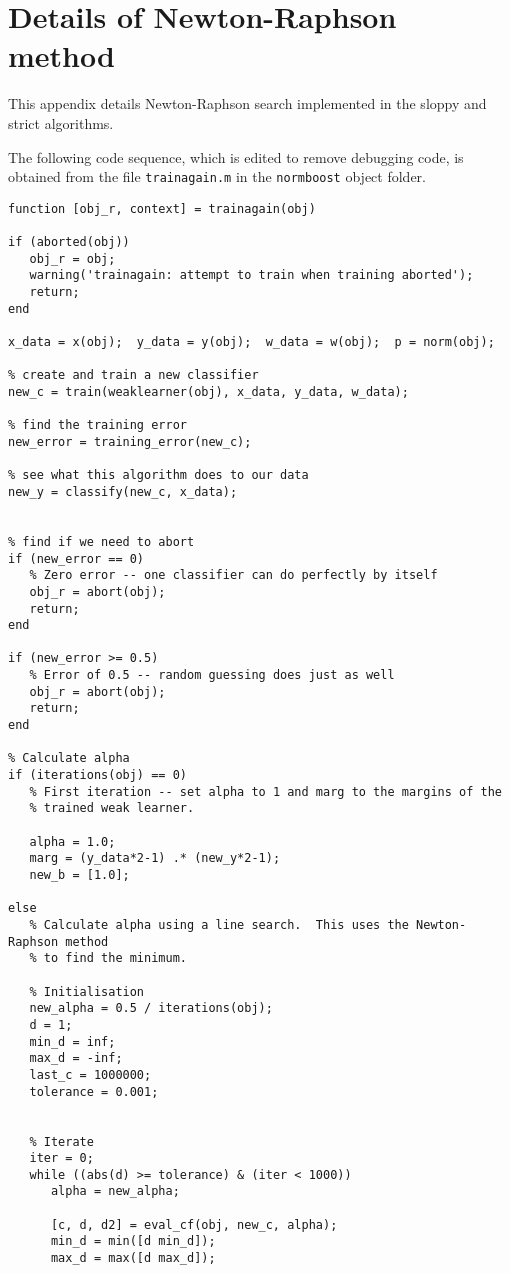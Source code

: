 
\chapter{Details of Newton-Raphson method}
\label{appendix:newton-raphson}

This appendix details Newton-Raphson search implemented in the sloppy
and strict algorithms.

The following code sequence, which is edited to remove debugging code,
is obtained from the file {\tt trainagain.m} in the {\tt normboost}
object folder.

\begin{verbatim}
function [obj_r, context] = trainagain(obj)

if (aborted(obj))
   obj_r = obj;
   warning('trainagain: attempt to train when training aborted');
   return;
end

x_data = x(obj);  y_data = y(obj);  w_data = w(obj);  p = norm(obj);

% create and train a new classifier
new_c = train(weaklearner(obj), x_data, y_data, w_data);

% find the training error
new_error = training_error(new_c);

% see what this algorithm does to our data
new_y = classify(new_c, x_data);


% find if we need to abort
if (new_error == 0)
   % Zero error -- one classifier can do perfectly by itself
   obj_r = abort(obj);
   return;
end

if (new_error >= 0.5)
   % Error of 0.5 -- random guessing does just as well
   obj_r = abort(obj);
   return;
end

% Calculate alpha
if (iterations(obj) == 0)
   % First iteration -- set alpha to 1 and marg to the margins of the
   % trained weak learner.

   alpha = 1.0;
   marg = (y_data*2-1) .* (new_y*2-1);
   new_b = [1.0];

else
   % Calculate alpha using a line search.  This uses the Newton-Raphson method
   % to find the minimum.

   % Initialisation
   new_alpha = 0.5 / iterations(obj);
   d = 1;
   min_d = inf;
   max_d = -inf;
   last_c = 1000000;
   tolerance = 0.001;
   
   
   % Iterate
   iter = 0;
   while ((abs(d) >= tolerance) & (iter < 1000))
      alpha = new_alpha;
      
      [c, d, d2] = eval_cf(obj, new_c, alpha);
      min_d = min([d min_d]);
      max_d = max([d max_d]);
      

\end{verbatim}

